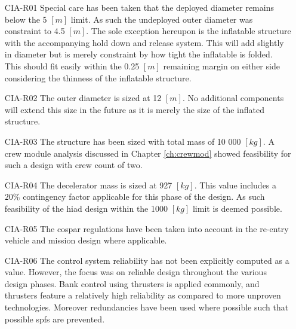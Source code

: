 \begin{itemize}[leftmargin=+20mm]
\item[CIA-R01] Special care has been taken that the deployed diameter remains below the 5 $[m]$ limit. As such the undeployed outer diameter was constraint to 4.5 $[m]$. The sole exception hereupon is the inflatable structure with the accompanying hold down and release system. This will add slightly in diameter but is merely constraint by how tight the inflatable is folded. This should fit easily within the 0.25 $[m]$ remaining margin on either side considering the thinness of the inflatable structure. 
\item[CIA-R02] The outer diameter is sized at 12 $[m]$. No additional components will extend this size in the future as it is merely the size of the inflated structure.
\item[CIA-R03] The structure has been sized with total mass of 10 000 $[kg]$. A crew module analysis discussed in Chapter \ref{ch:crewmod} showed feasibility for such a design with crew count of two.
\item[CIA-R04] The decelerator mass is sized at 927 $[kg]$. This value includes a $20\%$ contingency factor applicable for this phase of the design. As such feasibility of the \gls{hiad} design within the 1000 $[kg]$ limit is deemed possible.
\item[CIA-R05] The \gls{cospar} regulations have been taken into account in the re-entry vehicle and mission design where applicable.
\item[CIA-R06] The control system reliability has not been explicitly computed as a value. However, the focus was on reliable design throughout the various design phases. Bank control using thrusters is applied commonly, and thrusters feature a relatively high reliability as compared to more unproven technologies. Moreover redundancies have been used where possible such that possible \glspl{spf} are prevented. 
\end{itemize}


